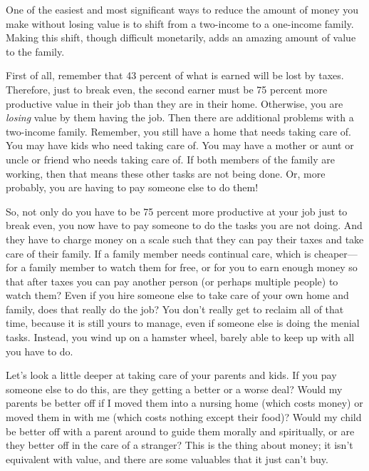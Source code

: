 \begin{infonote}
One of the easiest and most significant ways to reduce the amount of
money you make without losing value is to shift from a two-income to a
one-income family. Making this shift, though difficult monetarily, adds
an amazing amount of value to the family.

First of all, remember that 43 percent of what is earned will be lost by
taxes. Therefore, just to break even, the second earner must be 75
percent more productive value in their job than they are in their home.
Otherwise, you are \textit{losing} value by them having the job.
Then there are additional problems with a two-income family. 
Remember, you still have a home that needs taking
care of. You may have kids who need taking care of. You may have a
mother or aunt or uncle or friend who needs taking care of. If both
members of the family are working, then that means these other tasks
are not being done. Or, more probably, you are having to pay someone
else to do them!

So, not only do you have to be 75 percent more productive at your job
just to break even, you now have to pay someone to do the tasks you are
not doing. And they have to charge money on a scale such that they can
pay their taxes and take care of their family. If a family member needs
continual care, which is cheaper---for a family member to watch them for
free, or for you to earn enough money so that after taxes you can pay
another person (or perhaps multiple people) to watch them?  Even if you
hire someone else to take care of your own home and family, does that
really do the job?  You don’t really get to reclaim all of that time,
because it is still yours to manage, even if someone else is doing 
the menial tasks. Instead, you wind up on a hamster
wheel, barely able to keep up with all you have to do.

Let's look a little deeper at taking care of your parents and kids. 
If you pay someone else to do this, are they
getting a better or a worse deal?  Would my parents be better off if I
moved them into a nursing home (which costs money) or moved them in
with me (which costs nothing except their food)?  Would my child be
better off with a parent around to guide them morally and spiritually,
or are they better off in the care of a stranger?  This is the thing
about money; it isn’t equivalent with value, and there are some
valuables that it just can’t buy.


\end{infonote}
